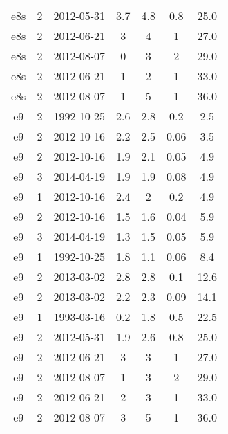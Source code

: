 \begin{table*}[htp]
\begin{tabular}{ccccccc}
e8s & 2 & 2012-05-31 & 3.7 & 4.8 & 0.8 & 25.0 \\
e8s & 2 & 2012-06-21 & 3 & 4 & 1 & 27.0 \\
e8s & 2 & 2012-08-07 & 0 & 3 & 2 & 29.0 \\
e8s & 2 & 2012-06-21 & 1 & 2 & 1 & 33.0 \\
e8s & 2 & 2012-08-07 & 1 & 5 & 1 & 36.0 \\
e9 & 2 & 1992-10-25 & 2.6 & 2.8 & 0.2 & 2.5 \\
e9 & 2 & 2012-10-16 & 2.2 & 2.5 & 0.06 & 3.5 \\
e9 & 2 & 2012-10-16 & 1.9 & 2.1 & 0.05 & 4.9 \\
e9 & 3 & 2014-04-19 & 1.9 & 1.9 & 0.08 & 4.9 \\
e9 & 1 & 2012-10-16 & 2.4 & 2 & 0.2 & 4.9 \\
e9 & 2 & 2012-10-16 & 1.5 & 1.6 & 0.04 & 5.9 \\
e9 & 3 & 2014-04-19 & 1.3 & 1.5 & 0.05 & 5.9 \\
e9 & 1 & 1992-10-25 & 1.8 & 1.1 & 0.06 & 8.4 \\
e9 & 2 & 2013-03-02 & 2.8 & 2.8 & 0.1 & 12.6 \\
e9 & 2 & 2013-03-02 & 2.2 & 2.3 & 0.09 & 14.1 \\
e9 & 1 & 1993-03-16 & 0.2 & 1.8 & 0.5 & 22.5 \\
e9 & 2 & 2012-05-31 & 1.9 & 2.6 & 0.8 & 25.0 \\
e9 & 2 & 2012-06-21 & 3 & 3 & 1 & 27.0 \\
e9 & 2 & 2012-08-07 & 1 & 3 & 2 & 29.0 \\
e9 & 2 & 2012-06-21 & 2 & 3 & 1 & 33.0 \\
e9 & 2 & 2012-08-07 & 3 & 5 & 1 & 36.0 \\
\hline
\end{tabular}

\end{table*}
